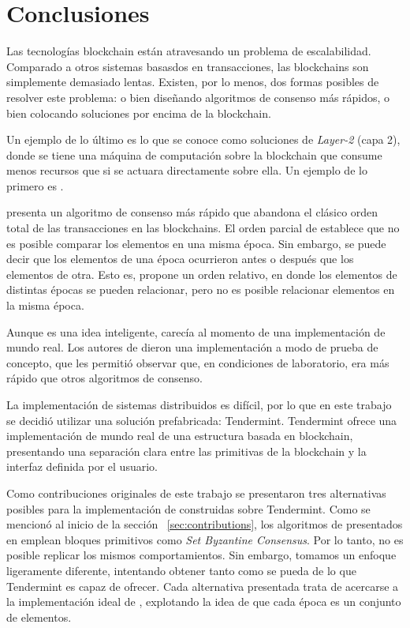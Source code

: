 %
\section{Conclusiones}
Las tecnologías blockchain están atravesando un problema de escalabilidad.
%
Comparado a otros sistemas basasdos en transacciones, las blockchains son simplemente
demasiado lentas.
%
Existen, por lo menos, dos formas posibles de resolver este problema: o bien
diseñando algoritmos de consenso más rápidos, o bien colocando soluciones por
encima de la blockchain.

%
Un ejemplo de lo último es lo que se conoce como soluciones de \emph{Layer-2}
(capa 2),
donde se tiene una máquina de computación sobre la blockchain que consume menos
recursos que si se actuara directamente sobre ella.
%
Un ejemplo de lo primero es \setchain.

\setchain presenta un algoritmo de consenso más rápido
que abandona el clásico orden total de las transacciones en las blockchains.
%
El orden parcial de \setchain establece que no es posible comparar los elementos
en una misma época.
%
Sin embargo, se puede decir que los elementos de una época ocurrieron antes o después
que los elementos de otra.
%
Esto es, \setchain propone un orden relativo, en donde los elementos
de distintas épocas se pueden relacionar, pero no es posible relacionar elementos
en la misma época.

Aunque \setchain es una idea inteligente, carecía al momento de una implementación
de mundo real.
%
Los autores de \setchain dieron una implementación a modo de prueba de concepto,
que les permitió observar que, en condiciones de laboratorio,
era más rápido que otros algoritmos de consenso.
%

La implementación de sistemas distribuidos es difícil, por lo que en este trabajo
se decidió utilizar una solución prefabricada: Tendermint.
Tendermint ofrece una implementación
de mundo real de una estructura basada en blockchain, presentando una separación clara
entre las primitivas de la blockchain y la interfaz definida por el usuario.


Como contribuciones originales de este trabajo se presentaron tres alternativas posibles para la implementación
de \setchain construidas sobre Tendermint. Como se mencionó al inicio de la sección ~\ref{sec:contributions},
los algoritmos de \setchain
presentados en \cite{Capretto.2022.Setchain} emplean bloques primitivos como
\emph{Set Byzantine Consensus}.
Por lo tanto, no es posible replicar los mismos comportamientos.
Sin embargo, tomamos un enfoque ligeramente diferente,
intentando obtener tanto como se pueda de lo que Tendermint es capaz de ofrecer.
Cada alternativa presentada trata de acercarse a la implementación ideal de \setchain,
explotando la idea de que cada época es un conjunto de elementos.

